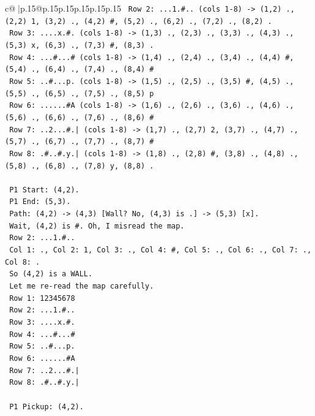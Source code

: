 \documentclass{article}
\begin{document}
{\begin{supertabular}{c@{$\;$}|p{.15\linewidth}@{}p{.15\linewidth}p{.15\linewidth}p{.15\linewidth}p{.15\linewidth}p{.15\linewidth}}
{{{\texttt{   Row 2: ...1.\#.. (cols 1{-}8) {-}> (1,2) ., (2,2) 1, (3,2) ., (4,2) \#, (5,2) ., (6,2) ., (7,2) ., (8,2) .} \\
\texttt{   Row 3: ....x.\#. (cols 1{-}8) {-}> (1,3) ., (2,3) ., (3,3) ., (4,3) ., (5,3) x, (6,3) ., (7,3) \#, (8,3) .} \\
\texttt{   Row 4: ...\#...\# (cols 1{-}8) {-}> (1,4) ., (2,4) ., (3,4) ., (4,4) \#, (5,4) ., (6,4) ., (7,4) ., (8,4) \#} \\
\texttt{   Row 5: ..\#...p. (cols 1{-}8) {-}> (1,5) ., (2,5) ., (3,5) \#, (4,5) ., (5,5) ., (6,5) ., (7,5) ., (8,5) p} \\
\texttt{   Row 6: ......\#A (cols 1{-}8) {-}> (1,6) ., (2,6) ., (3,6) ., (4,6) ., (5,6) ., (6,6) ., (7,6) ., (8,6) \#} \\
\texttt{   Row 7: ..2...\#.| (cols 1{-}8) {-}> (1,7) ., (2,7) 2, (3,7) ., (4,7) ., (5,7) ., (6,7) ., (7,7) ., (8,7) \#} \\
\texttt{   Row 8: .\#..\#.y.| (cols 1{-}8) {-}> (1,8) ., (2,8) \#, (3,8) ., (4,8) ., (5,8) ., (6,8) ., (7,8) y, (8,8) .} \\
\\ 
\texttt{   P1 Start: (4,2).} \\
\texttt{   P1 End: (5,3).} \\
\texttt{   Path: (4,2) {-}> (4,3) {[}Wall? No, (4,3) is .{]} {-}> (5,3) {[}x{]}.} \\
\texttt{   Wait, (4,2) is \#. Oh, I misread the map.} \\
\texttt{   Row 2: ...1.\#..} \\
\texttt{   Col 1: ., Col 2: 1, Col 3: ., Col 4: \#, Col 5: ., Col 6: ., Col 7: ., Col 8: .} \\
\texttt{   So (4,2) is a WALL.} \\
\texttt{   Let me re{-}read the map carefully.} \\
\texttt{   Row 1: 12345678} \\
\texttt{   Row 2: ...1.\#..} \\
\texttt{   Row 3: ....x.\#.} \\
\texttt{   Row 4: ...\#...\#} \\
\texttt{   Row 5: ..\#...p.} \\
\texttt{   Row 6: ......\#A} \\
\texttt{   Row 7: ..2...\#.|} \\
\texttt{   Row 8: .\#..\#.y.|} \\
\\ 
\texttt{   P1 Pickup: (4,2).} \\
}}}
\end{supertabular}}
\end{document}

